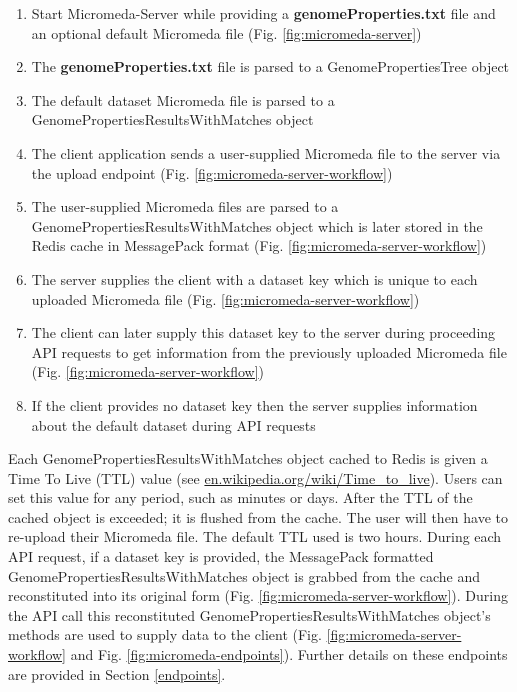\begin{enumerate}
  \item Start Micromeda-Server while providing a \textbf{genomeProperties.txt} file and an optional default Micromeda file (Fig. \ref{fig:micromeda-server})
  \item The \textbf{genomeProperties.txt} file is parsed to a GenomePropertiesTree object
  \item The default dataset Micromeda file is parsed to a GenomePropertiesResultsWithMatches object  
  \item The client application sends a user-supplied Micromeda file to the server via the upload endpoint (Fig. \ref{fig:micromeda-server-workflow})
  \item The user-supplied Micromeda files are parsed to a GenomePropertiesResultsWithMatches object which is later stored in the Redis cache in MessagePack format (Fig. \ref{fig:micromeda-server-workflow})
  \item The server supplies the client with a dataset key which is unique to each uploaded Micromeda file (Fig. \ref{fig:micromeda-server-workflow})
  \item The client can later supply this dataset key to the server during proceeding API requests to get information from the previously uploaded Micromeda file (Fig. \ref{fig:micromeda-server-workflow})
  \item If the client provides no dataset key then the server supplies information about the default dataset during API requests
\end{enumerate}

Each GenomePropertiesResultsWithMatches object cached to Redis is given a Time To Live (TTL) value \cite{gwertzman1996world} (see \href{en.wikipedia.org/wiki/Time\_to\_live}{en.wikipedia.org/wiki/Time\_to\_live}). Users can set this value for any period, such as minutes or days. After the TTL of the cached object is exceeded; it is flushed from the cache. The user will then have to re-upload their Micromeda file. The default TTL used is two hours. During each API request, if a dataset key is provided, the MessagePack formatted GenomePropertiesResultsWithMatches object is grabbed from the cache and reconstituted into its original form (Fig. \ref{fig:micromeda-server-workflow}). During the API call this reconstituted GenomePropertiesResultsWithMatches object's methods are used to supply data to the client  (Fig. \ref{fig:micromeda-server-workflow} and Fig. \ref{fig:micromeda-endpoints}). Further details on these endpoints are provided in Section \ref{endpoints}.

